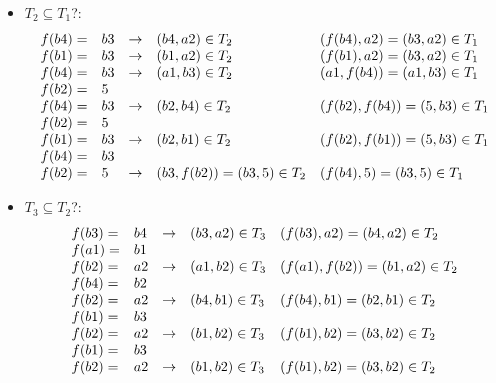 \begin{exercise}{5}

\begin{subexercise}
  \begin{itemize} \item $T_2\subseteq T_1$?:
    \begin{displaymath}
      \begin{array}{l l c l l}
        f(b4) = & b3 & \rightarrow & (b4,a2) \in T_2 & (f(b4), a2)=(b3,a2)\in T_1\\
        f(b1) = & b3 & \rightarrow & (b1,a2) \in T_2 & (f(b1), a2)=(b3,a2)\in T_1\\
        f(b4) = & b3 & \rightarrow & (a1,b3) \in T_2 & (a1, f(b4))=(a1,b3)\in T_1\\
        f(b2) = & 5 & & & \\
        f(b4) = & b3 & \rightarrow & (b2, b4) \in T_2 & (f(b2), f(b4))=(5,b3) \in T_1\\
        f(b2) = & 5 & & & \\
        f(b1) = & b3& \rightarrow & (b2, b1) \in T_2 & (f(b2), f(b1))=(5,b3) \in T_1 \\
        f(b4) = & b3 & & & \\
        f(b2) = & 5 &\rightarrow & (b3, f(b2)) = (b3,5) \in T_2 &
        (f(b4),5)=(b3,5)\in T_1
      \end{array}
    \end{displaymath}
    \item $T_3\subseteq T_2$?:
    \begin{displaymath}
      \begin{array}{ l l c l l }
        f(b3) = & b4 & \rightarrow & (b3,a2)\in T_3 & (f(b3),a2) = (b4,a2)\in T_2 \\

        f(a1) = &b1 & & & \\
        f(b2) = & a2 & \rightarrow & (a1,b2)\in T_3 & (f(a1),f(b2)) = (b1,a2) \in
        T_2 \\

        f(b4) = & b2 & & & \\
        f(b2) = & a2 & \rightarrow & (b4,b1)\in T_3 & (f(b4),b1) = (b2,b1) \in T_2
        \\

        f(b1) = & b3 & & & \\
        f(b2) = & a2 & \rightarrow & (b1,b2)\in T_3 & (f(b1),b2) = (b3,b2)\in
        T_2 \\

        f(b1) = & b3 & & & \\
        f(b2) = & a2 & \rightarrow & (b1,b2) \in T_3 & (f(b1),b2) = (b3,b2)\in
        T_2 \\


\end{array}
\end{displaymath}
\end{itemize}
\end{subexercise}
\end{exercise}
